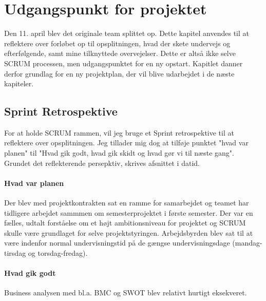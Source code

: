 \chapter{Udgangspunkt for projektet}
\label{chapter:udgangspunkt}

Den 11. april blev det originale team splittet op. Dette kapitel anvendes til at reflektere over forløbet op til opsplitningen, hvad der skete undervejs og efterfølgende, samt mine tilknyttede overvejelser.
Dette er altså ikke selve SCRUM processen, men udgangspunktet for en ny opstart. Kapitlet danner derfor grundlag for en ny projektplan, der vil blive udarbejdet i de næste kapiteler.

\section{Sprint Retrospektive}
For at holde SCRUM rammen, vil jeg bruge et Sprint retrospektive til at reflektere over opsplitningen.
Jeg tillader mig dog at tilføje punktet "hvad var planen" til "Hvad gik godt, hvad gik skidt og hvad gør vi til næste gang". Grundet det reflekterende persepktiv, skrives afsnittet i datid.  

\subsubsection{Hvad var planen}
Der blev med projektkontrakten sat en ramme for samarbejdet og teamet har tidligere arbejdet sammmen om semesterprojektet i første semester.
Der var en fælles, udtalt forståelse om et højt ambitionsniveau for projektet og SCRUM skulle være grundlaget for selve projektstyringen.
Arbejdsbyrden blev sat til at være indenfor normal undervisningstid på de gængse undervisningsdage (mandag-tirsdag og torsdag-fredag).

\subsubsection{Hvad gik godt}
Business analysen med bl.a. BMC og SWOT blev relativt hurtigt eksekveret.

